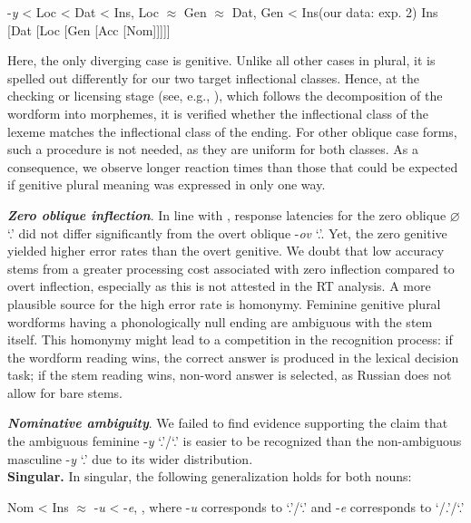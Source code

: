 \documentclass[output=paper, modfonts,newtxmath,hidelinks]{langscibook}
\begin{document}
\ea \ea	\label{ex:plHierarchy} -\textit{y} < Loc < Dat < Ins, Loc $\approx$ Gen $\approx$ Dat, Gen < Ins\hfill (our data: exp. 2)
    \ex \label{ex:cahafunc} \ob Ins [Dat [Loc [Gen [Acc [Nom]]]]]\cb
    \z 
\z

\noindent Here, the only diverging case is genitive. Unlike all other cases in plural, it is spelled out differently for our two target inflectional classes. Hence, at the checking or licensing stage (see, e.g., \citealt{bertram2000role}), which follows the decomposition of the wordform into morphemes,  it is verified whether the inflectional class of the lexeme matches the inflectional class of the ending. For other oblique case forms, such a procedure is not needed, as they are uniform for both classes. As a consequence, we observe longer reaction times than those that could be expected if genitive plural meaning was expressed in only one way.

\textbf{\textit{Zero oblique inflection}}. In line with \citet{gor2017processing}, response latencies for the zero oblique \textit{$\varnothing$} `\genn.\pl' did not differ significantly from the overt oblique -\textit{ov} `\genn.\pl'. Yet, the zero genitive yielded higher error rates than the overt genitive. We doubt that low accuracy stems from a greater processing cost associated with zero inflection compared to overt inflection, especially as this is not attested in the RT analysis. A more plausible source for the high error rate is homonymy. Feminine genitive plural wordforms having a phonologically null ending are ambiguous with the stem itself. This homonymy might lead to a competition in the recognition process: if the wordform reading wins, the correct answer is produced in the lexical decision task; if the stem reading wins, non-word answer is selected, as Russian does not allow for bare stems.

\textbf{\textit{Nominative ambiguity}}. We failed to find evidence supporting the claim that the ambiguous feminine -\textit{y} `\nomm.\pl'\slash `\genn.\sg' is easier to be recognized than the non-ambiguous masculine -\textit{y} `\nomm.\pl' due to its wider distribution.\\

\textbf{Singular.} In singular, the following generalization holds for both nouns:

\ea	Nom < Ins $\approx$ -\textit{u} < -\textit{e}, , where -\textit{u} corresponds to `\accc.\fem'\slash `\datt.\masc' and -\textit{e} corresponds to `{\datt/\locc.\fem}’\slash `{\locc.\masc}’
\z 
\end{document}
